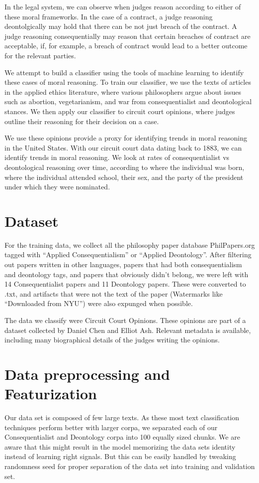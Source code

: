 \documentclass{article}
\begin{document}
In the legal system, we can observe when judges  reason according to either of these moral frameworks. In the case of a contract, a judge reasoning deontolgically may hold that there can be not just breach of the contract. A judge reasoning consequentially may reason that certain breaches of contract are acceptable, if, for example, a breach of contract would lead to a better outcome for the relevant parties.

We attempt to build a classifier using the tools of machine learning to identify these cases of moral reasoning. To train our classifier, we use the texts of articles in the applied ethics literature, where various philosophers argue about issues such as abortion, vegetarianism, and war from consequentialist and deontological stances. We then apply our classifier to circuit court opinions, where judges outline their reasoning for their decision on a case.

We use these opinions provide a proxy for identifying trends in moral reasoning in the United States. With our circuit court data dating back to 1883, we can identify trends in moral reasoning. We look at rates of consequentialist vs deontological reasoning over time, according to where the individual was born, where the individual attended school, their sex, and the party of the president under which they were nominated.

\section{Dataset}
For the training data, we collect all the philosophy paper database PhilPapers.org tagged with “Applied Consequentialism” or “Applied Deontology”. After filtering out papers written in other languages, papers that had both consequentialism and deontology tags, and papers that obviously didn’t belong, we were left with 14 Consequentialist papers and 11 Deontology papers. These were converted to .txt, and artifacts that were not the text of the paper (Watermarks like “Downloaded from NYU”) were also expunged when possible.

The data we classify were Circuit Court Opinions. These opinions are part of a dataset collected by Daniel Chen and Elliot Ash. Relevant metadata is available, including many biographical details of the judges writing the opinions.

\section{Data preprocessing and Featurization}
Our data set is composed of few large texts. As these most text classification techniques perform better with larger corpa, we separated each of our Consequentialist and Deontology corpa into 100 equally sized chunks. We are aware that this might result in the model memorizing the data sets identity instead of learning right signals. But this can be easily handled by tweaking randomness seed for proper separation of the data set into training and validation set.
\end{document}
